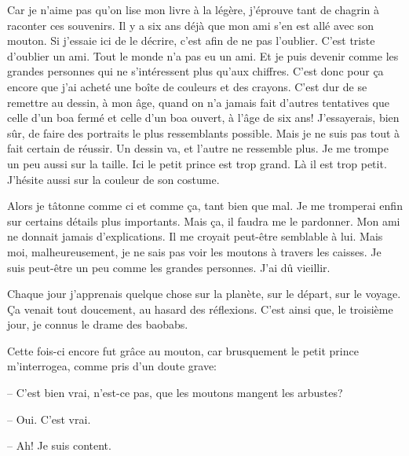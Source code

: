 \documentclass[a4paper]{report}
\begin{document}
Car je n'aime pas qu'on lise mon livre à la légère, j'éprouve tant de chagrin à raconter ces souvenirs. Il y a six ans déjà que mon ami s'en est allé avec son mouton. Si j'essaie ici de le décrire, c'est afin de ne pas l'oublier. C'est triste d'oublier un ami. Tout le monde n'a pas eu un ami. Et je puis devenir comme les grandes personnes qui ne s'intéressent plus qu'aux chiffres. C'est donc pour ça encore que j'ai acheté une boîte de couleurs et des crayons. C'est dur de se remettre au dessin, à mon âge, quand on n'a jamais fait d'autres tentatives que celle d'un boa fermé et celle d'un boa ouvert, à l'âge de six ans! J'essayerais, bien sûr, de faire des portraits le plus ressemblants possible. Mais je ne suis pas tout à fait certain de réussir. Un dessin va, et l'autre ne ressemble plus. Je me trompe un peu aussi sur la taille. Ici le petit prince est trop grand. Là il est trop petit. J'hésite aussi sur la couleur de son costume.

Alors je tâtonne comme ci et comme ça, tant bien que mal. Je me tromperai enfin sur certains détails plus importants. Mais ça, il faudra me le pardonner. Mon ami ne donnait jamais d'explications. Il me croyait peut-être semblable à lui. Mais moi, malheureusement, je ne sais pas voir les moutons à travers les caisses. Je suis peut-être un peu comme les grandes personnes. J'ai dû vieillir.

\parachapter[V]{} %
Chaque jour j'apprenais quelque chose sur la planète, sur le départ, sur le voyage. Ça venait tout doucement, au hasard des réflexions. C'est ainsi que, le troisième jour, je connus le drame des baobabs.

Cette fois-ci encore fut grâce au mouton, car brusquement le petit prince m'interrogea, comme pris d'un doute grave:

-- C'est bien vrai, n'est-ce pas, que les moutons mangent les arbustes?

-- Oui. C'est vrai.

-- Ah! Je suis content.
\end{document}
